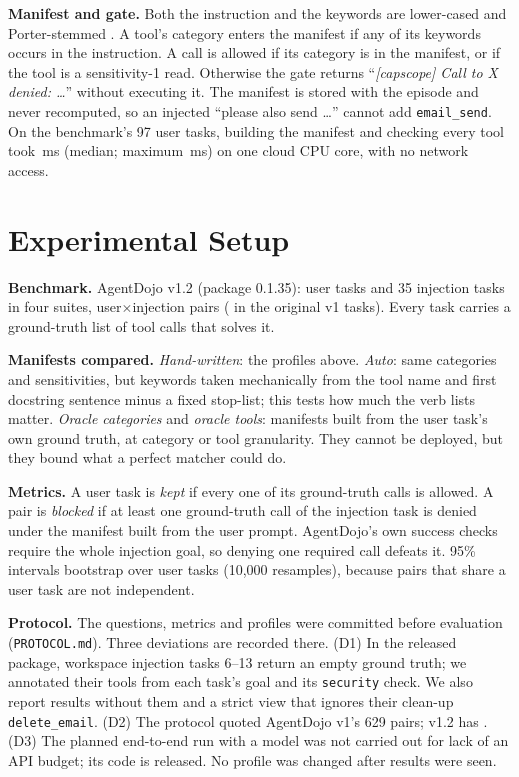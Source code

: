 \documentclass[10pt,twocolumn,letterpaper]{article}
\newcommand{\tool}[1]{\texttt{\small #1}}
\begin{document}
\textbf{Manifest and gate.} Both the instruction and the keywords are lower-cased and Porter-stemmed
\cite{porter1980,bird2009}. A tool's category enters the manifest if any of its keywords occurs in the instruction. A
call is allowed if its category is in the manifest, or if the tool is a sensitivity-1 read. Otherwise the gate returns
``\emph{[capscope] Call to X denied: \dots}'' without executing it. The manifest is stored with the episode and never
recomputed, so an injected ``please also send \dots'' cannot add \tool{email\_send}. On the benchmark's 97 user tasks,
building the manifest and checking every tool took \,ms (median; maximum \,ms) on one cloud
CPU core, with no network access.

\section{Experimental Setup}\label{sec:setup}
\textbf{Benchmark.} AgentDojo v1.2 (package 0.1.35):  user tasks and 35 injection tasks in four suites,
 user$\times$injection pairs ( in the original v1 tasks). Every task carries a ground-truth list
of tool calls that solves it.

\textbf{Manifests compared.} \emph{Hand-written}: the profiles above. \emph{Auto}: same categories and sensitivities, but
keywords taken mechanically from the tool name and first docstring sentence minus a fixed stop-list; this tests how much
the verb lists matter. \emph{Oracle categories} and \emph{oracle tools}: manifests built from the user task's own
ground truth, at category or tool granularity. They cannot be deployed, but they bound what a perfect matcher could do.

\textbf{Metrics.} A user task is \emph{kept} if every one of its ground-truth calls is allowed. A pair is
\emph{blocked} if at least one ground-truth call of the injection task is denied under the manifest built from the user
prompt. AgentDojo's own success checks require the whole injection goal, so denying one required call defeats it. 95\%
intervals bootstrap over user tasks (10{,}000 resamples), because pairs that share a user task are not independent.

\textbf{Protocol.} The questions, metrics and profiles were committed before evaluation (\texttt{PROTOCOL.md}). Three
deviations are recorded there. (D1) In the released package, workspace injection tasks 6--13 return an empty ground
truth; we annotated their tools from each task's goal and its \texttt{security} check. We also report results without
them and a strict view that ignores their clean-up \tool{delete\_email}. (D2) The protocol quoted AgentDojo v1's 629
pairs; v1.2 has . (D3) The planned end-to-end run with a model was not carried out for lack of an API
budget; its code is released. No profile was changed after results were seen.
\end{document}
